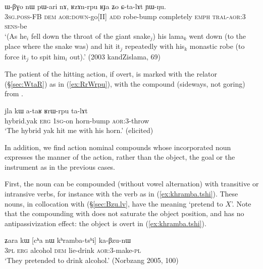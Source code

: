 \begin{exe}
\ex \label{ex:RzAnrpu}
 \gll ɯ-βɣo nɯ pɯ-ari nɤ, ʁzɤn-rpu ʁɟa ʑo ɕ-ta-lɤt ɲɯ-ŋu. \\
 \textsc{3sg}.\textsc{poss}-FB \textsc{dem} \textsc{aor}:\textsc{down}-go[II] \textsc{add} robe-bump completely \textsc{emph} \textsc{tral}-\textsc{aor}:3\flobv{} \textsc{sens}-be \\
\glt `(As he$_i$ fell down the throat of the giant snake$_j$) his lama$_k$ went down (to the place where the snake was) and hit it$_j$ repeatedly with his$_k$  monastic robe (to force it$_j$ to spit him$_i$ out).' (2003 kandZislama, 69)
\end{exe}

The patient of the hitting action, if overt, is marked with the relator   (§\ref{sec:WtaR}) as in (\ref{ex:RrWrpu}), with the compound  (sideways, not goring) from .

\begin{exe}
\ex \label{ex:RrWrpu}
 \gll jla kɯ a-taʁ ʁrɯ-rpu ta-lɤt \\
 hybrid.yak \textsc{erg} \textsc{1sg}-on  horn-bump \textsc{aor}:3\flobv{}-throw \\
 \glt `The hybrid yak hit me with his horn.' (elicited)
\end{exe}
 
In addition, we find action nominal compounds whose incorporated noun expresses the manner of the action, rather than the object, the goal or the instrument as in the previous cases. 

First, the noun  can be compounded (without vowel alternation) with transitive or intransive verbs, for instance with the verb  as  in (\ref{ex:khramba.tshi}). These nouns, in collocation with  (§\ref{sec:Bzu.lv}, have the meaning `pretend to $X$'. Note that the compounding with  does not saturate the object position, and has no antipassivization effect: the object  is overt in (\ref{ex:khramba.tshi}).

\begin{exe}
\ex \label{ex:khramba.tshi}
\gll ʑara kɯ [cʰa nɯ kʰramba-tsʰi] ka-βzu-nɯ \\
\textsc{3pl} \textsc{erg} alcohol \textsc{dem} lie-drink \textsc{aor}:3\flobv{}-make-\textsc{pl} \\
\glt `They pretended to drink alcohol.' (Norbzang 2005, 100)
\end{exe}

